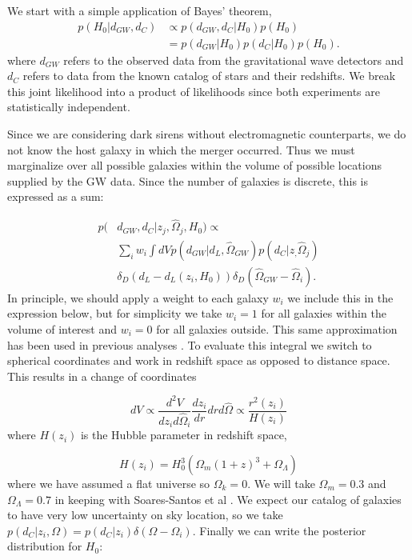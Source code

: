 
We start with a simple application of Bayes' theorem,
\begin{align}
    p(H_0|d_{GW}, d_C)&\propto p(d_{GW}, d_C|H_0)p(H_0)\nonumber\\
    &= p(d_{GW}|H_0)p(d_C|H_0)p(H_0).
\label{eq:bayes}
\end{align}
where $d_{GW}$ refers to the observed data from the gravitational wave detectors and $d_C$ refers to data from the known catalog of stars and their redshifts. We break this joint likelihood into a product of likelihoods since both experiments are statistically independent.

Since we are considering dark sirens without electromagnetic counterparts, we do not know the host galaxy in which the merger occurred. Thus we must marginalize over all possible galaxies within the volume of possible locations supplied by the GW data. Since the number of galaxies is discrete, this is expressed as a sum:

\begin{align}
    p(&d_{GW}, d_C|{z_j, \hat{\Omega}_j},H_0)  \propto  \nonumber\\
    &\sum_{i} w_i \int dV p(d_{GW}|d_L, \hat{\Omega}_{GW}) 
    p(d_C|{z_, \hat{\Omega}_j}) \nonumber\\
    & \delta_D (d_L - d_L(z_i, H_0)) \delta_D (\hat{\Omega}_{GW} - \hat{\Omega}_i).
    \label{eq:marginal_like}
\end{align}
In principle, we should apply a weight to each galaxy $w_i$ we include this in the expression below, but for simplicity we take $w_i=1$ for all galaxies within the volume of interest and $w_i=0$ for all galaxies outside. This same approximation has been used in previous analyses \cite{Chen_2018,GW170814_DES,Nair_2018}. To evaluate this integral we switch to spherical coordinates and work in redshift space as opposed to distance space. This results in a change of coordinates

\begin{equation}
dV \propto \frac{d^2 V}{d z_i d\hat{\Omega}_i} \frac{d z_i}{d r} d r d\hat{\Omega} \propto \frac{r^2(z_i)}{H(z_i)}
\end{equation}
where $H(z_i)$ is the Hubble parameter in redshift space,

\begin{equation}
H(z_i) = H_0^3 \left(\Omega_m (1+z)^3 + \Omega_\Lambda\right)
\end{equation}
where we have assumed a flat universe so $\Omega_k = 0$. We will take $\Omega_m = 0.3$ and $\Omega_\Lambda = 0.7$ in keeping with Soares-Santos et al \cite{GW170814_DES}. We expect our catalog of galaxies to have very low uncertainty on sky location, so we take $p(d_C|z_i,\Omega)=p(d_C|z_i)\delta(\Omega - \Omega_i)$. Finally we can write the posterior distribution for $H_0$:

